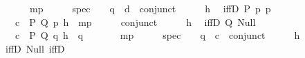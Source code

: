 \begin{isabellebody}
\ \ \ \ \ \ \ mp\ {\isasymcdot}\ {\isacharunderscore}{\kern0pt}\ {\isasymcdot}\ {\isacharunderscore}{\kern0pt}\ {\isasymbullet}\ {\isacharparenleft}{\kern0pt}spec\ {\isasymcdot}\ {\isacharunderscore}{\kern0pt}\ {\isasymcdot}\ q\ {\isasymbullet}\ d\ {\isasymbullet}\ {\isacharparenleft}{\kern0pt}conjunct{}\ {\isasymcdot}\ {\isacharunderscore}{\kern0pt}\ {\isasymcdot}\ {\isacharunderscore}{\kern0pt}\ {\isasymbullet}\ h{\isacharparenright}{\kern0pt}{\isacharparenright}{\kern0pt}{\isachardoublequoteclose}\isanewline
\isanewline
\ \ iffD{}\ {\isacharparenleft}{\kern0pt}P{\isacharparenright}{\kern0pt}{\isacharcolon}{\kern0pt}\ {\isachardoublequoteopen}{\isasymlambda}p{\isachardot}{\kern0pt}\ p{\isachardoublequoteclose}\isanewline
\ \ \ \ {\isachardoublequoteopen}\isactrlbold {\isasymlambda}{\isacharparenleft}{\kern0pt}c{\isacharcolon}{\kern0pt}\ {\isacharunderscore}{\kern0pt}{\isacharparenright}{\kern0pt}\ P\ Q\ p\ {\isacharparenleft}{\kern0pt}h{\isacharcolon}{\kern0pt}\ {\isacharunderscore}{\kern0pt}{\isacharparenright}{\kern0pt}{\isachardot}{\kern0pt}\ mp\ {\isasymcdot}\ {\isacharunderscore}{\kern0pt}\ {\isasymcdot}\ {\isacharunderscore}{\kern0pt}\ {\isasymbullet}\ {\isacharparenleft}{\kern0pt}conjunct{}\ {\isasymcdot}\ {\isacharunderscore}{\kern0pt}\ {\isasymcdot}\ {\isacharunderscore}{\kern0pt}\ {\isasymbullet}\ h{\isacharparenright}{\kern0pt}{\isachardoublequoteclose}\isanewline
\isanewline
\ \ iffD{}\ {\isacharparenleft}{\kern0pt}Q{\isacharparenright}{\kern0pt}{\isacharcolon}{\kern0pt}\ {\isachardoublequoteopen}Null{\isachardoublequoteclose}\isanewline
\ \ \ \ {\isachardoublequoteopen}\isactrlbold {\isasymlambda}{\isacharparenleft}{\kern0pt}c{\isacharcolon}{\kern0pt}\ {\isacharunderscore}{\kern0pt}{\isacharparenright}{\kern0pt}\ P\ Q\ q{}\ {\isacharparenleft}{\kern0pt}h{\isacharcolon}{\kern0pt}\ {\isacharunderscore}{\kern0pt}{\isacharparenright}{\kern0pt}\ q{}{\isachardot}{\kern0pt}\isanewline
\ \ \ \ \ \ \ mp\ {\isasymcdot}\ {\isacharunderscore}{\kern0pt}\ {\isasymcdot}\ {\isacharunderscore}{\kern0pt}\ {\isasymbullet}\ {\isacharparenleft}{\kern0pt}spec\ {\isasymcdot}\ {\isacharunderscore}{\kern0pt}\ {\isasymcdot}\ q{}\ {\isasymbullet}\ c\ {\isasymbullet}\ {\isacharparenleft}{\kern0pt}conjunct{}\ {\isasymcdot}\ {\isacharunderscore}{\kern0pt}\ {\isasymcdot}\ {\isacharunderscore}{\kern0pt}\ {\isasymbullet}\ h{\isacharparenright}{\kern0pt}{\isacharparenright}{\kern0pt}{\isachardoublequoteclose}\isanewline
\isanewline
\ \ iffD{}{\isacharcolon}{\kern0pt}\ {\isachardoublequoteopen}Null{\isachardoublequoteclose}\ {\isachardoublequoteopen}iffD{}{\isachardoublequoteclose}\isanewline

\end{isabellebody}
